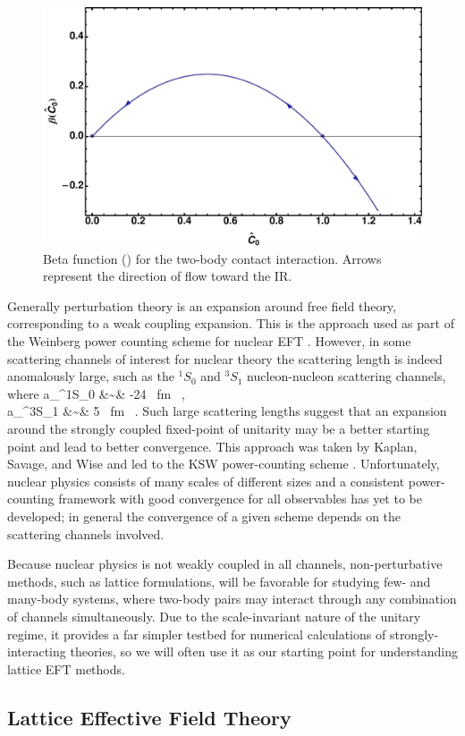\begin{figure}
\caption{\label{fig:beta}Beta function () for the two-body contact interaction. Arrows represent the direction of flow toward the IR.}
\includegraphics[width=0.5\linewidth]{Chapter5-figures/beta.pdf}
\end{figure}

Generally perturbation theory is an expansion around free field theory, corresponding to a weak coupling expansion. This is the approach used as part of the Weinberg power counting scheme for nuclear EFT \cite{Weinberg:1990rz,Weinberg:1991um}. However, in some scattering channels of interest for nuclear theory the scattering length is indeed anomalously large, such as the $^1S_0$ and $^3S_1$ nucleon-nucleon scattering channels, where
\beq
a_{^1S_0} &\sim& -24 \mbox{ fm} \ , \\
a_{^3S_1} &\sim& 5 \mbox{ fm} \ .
\eeq
Such large scattering lengths suggest that an expansion around the strongly coupled fixed-point of unitarity may be a better starting point and lead to better convergence. This approach was taken by Kaplan, Savage, and Wise and led to the KSW power-counting scheme \cite{Kaplan:1998we,Kaplan:1998tg,Kaplan:1996xu}. Unfortunately, nuclear physics consists of many scales of different sizes and a consistent power-counting framework with good convergence for all observables has yet to be developed; in general the convergence of a given scheme depends on the scattering channels involved. 

Because nuclear physics is not weakly coupled in all channels, non-perturbative methods, such as lattice formulations, will be favorable for studying few- and many-body systems, where two-body pairs may interact through any combination of channels simultaneously. Due to the scale-invariant nature of the unitary regime, it provides a far simpler testbed for numerical calculations of strongly-interacting theories, so we will often use it as our starting point for understanding lattice EFT methods. 

\subsection{\label{sec:LEFT}Lattice Effective Field Theory}

